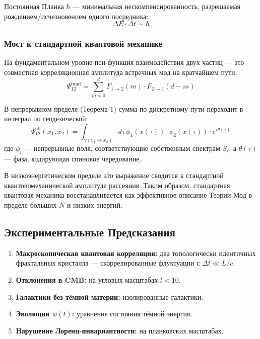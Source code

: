 \documentclass[12pt,a4paper]{article}
\begin{document}
Постоянная Планка $\hbar$ --- минимальная нескомпенсированность, разрешаемая рождением/исчезновением одного посредника:
\begin{equation}
    \Delta E \cdot \Delta t \sim \hbar
\end{equation}

\subsubsection{Мост к стандартной квантовой механике}
На фундаментальном уровне пси-функция взаимодействия двух частиц --- это совместная корреляционная амплитуда встречных мод на кратчайшем пути:
\begin{equation}
    \Psi_{12}^{\text{fund}} = \sum_{m=0}^{d} F_{1 \to 2}(m) \cdot F_{2 \to 1}(d-m)
\end{equation}

В непрерывном пределе (Теорема 1) сумма по дискретному пути переходит в интеграл по геодезической:
\begin{equation}
    \Psi_{12}^{\text{eff}}(x_1, x_2) = \int_{\gamma(x_1 \to x_2)} d\tau \, \phi_1(x(\tau)) \cdot \phi_2(x(\tau)) \cdot e^{i\theta(\tau)}
\end{equation}
где $\phi_i$ --- непрерывные поля, соответствующие собственным спектрам $S_i$, а $\theta(\tau)$ --- фаза, кодирующая спиновое чередование.

В низкоэнергетическом пределе это выражение сводится к стандартной квантовомеханической амплитуде рассеяния. Таким образом, стандартная квантовая механика восстанавливается как эффективное описание Теории Мод в пределе больших $N$ и низких энергий.

\subsection{Экспериментальные Предсказания}
\begin{enumerate}[label=\arabic*.]
    \item \textbf{Макроскопическая квантовая корреляция:} два топологически идентичных фрактальных кристалла --- скоррелированные флуктуации с $\Delta t \ll L/c$.
    \item \textbf{Отклонения в CMB:} на угловых масштабах $l < 10$.
    \item \textbf{Галактики без тёмной материи:} изолированные галактики.
    \item \textbf{Эволюция $w(t)$:} уравнение состояния тёмной энергии.
    \item \textbf{Нарушение Лоренц-инвариантности:} на планковских масштабах.
\end{enumerate}
\end{document}
